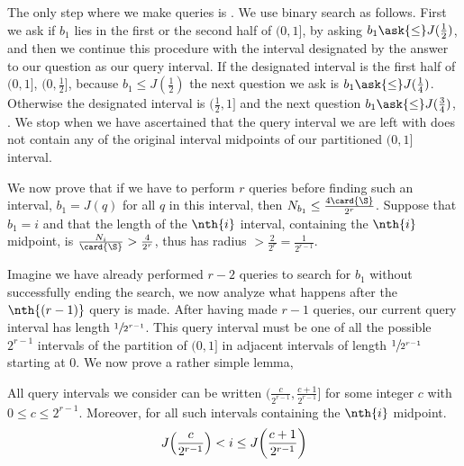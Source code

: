 The only step where we make queries is . We use binary
search as follows. First we ask if $b_1$ lies in the first or the second
half of $(0,1]$, by asking $b_1 \ask{\le} J(\frac{1}{2})$, and then we continue
this procedure with the interval designated by the answer to our question as
our query interval. If the designated interval is the first half of $(0,1]$,
\ie $(0, \frac{1}{2}]$, because $b_1 \le J(\frac{1}{2})$ the next question we
ask is $b_1 \ask{\le} J(\frac{1}{4})$. Otherwise the designated interval
is $(\frac{1}{2},1]$ and the next question $b_1 \ask{\le} J(\frac{3}{4})$,
\etc. We stop when we have ascertained that the query interval we are left with
does not contain any of the original interval midpoints of our partitioned
$(0,1]$ interval.

We now prove that if we have to perform $r$ queries before finding such an
interval, $b_1 = J(q)$ for all $q$ in this interval, then $N_{b_1} \le
\frac{4\card{\S}}{2^r}$. Suppose that $b_1 = i$ and that the length of the
$\nth{i}$ interval, containing the $\nth{i}$ midpoint, is
$\frac{N_i}{\card{\S}} > \frac{4}{2^r}$, thus has radius $> \frac{2}{2^r} =
\frac{1}{2^{r-1}}$.

Imagine we have already performed $r-2$ queries to search for $b_1$ without
successfully ending the search, we now analyze what happens after the
$\nth{(r-1)}$ query is made. After having made $r-1$ queries, our current query
interval has length $\sfrac{1}{2^{r-1}}$. This query interval must be one of
all the possible $2^{r-1}$ intervals of the partition of $(0,1]$ in adjacent
intervals of length $\sfrac{1}{2^{r-1}}$ starting at $0$. We now prove a rather
simple lemma,

\begin{lemma}
\label{lemma:xy:dt:qi}
All query intervals we consider can be written $(\frac{c}{2^{r-1}},
\frac{c+1}{2^{r-1}}]$ for some integer $c$ with $0 \le c \le 2^{r-1}$.
Moreover, for all such intervals containing the \(\nth{i}\) midpoint.
\begin{displaymath}
J\mleft(\frac{c}{2^{r-1}}\mright) < i \le J\mleft(\frac{c+1}{2^{r-1}}\mright)
\end{displaymath}
\end{lemma}

